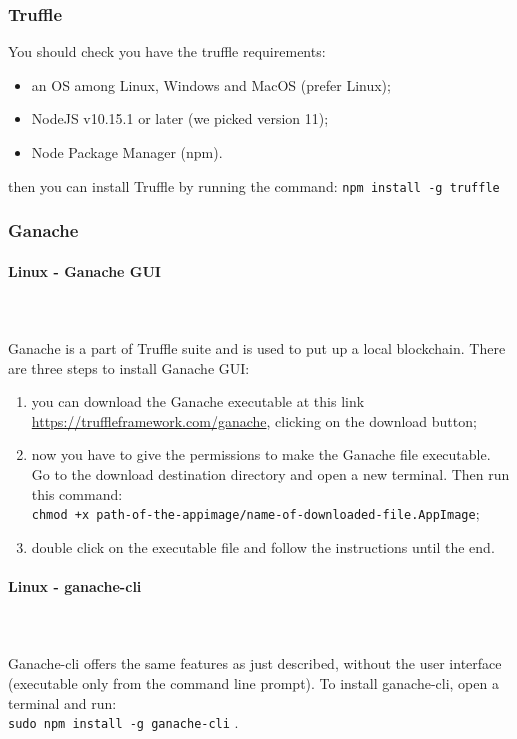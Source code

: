 \subsubsection{Truffle}
You should check you have the truffle requirements:
\begin{itemize}
	\item an OS among Linux, Windows and MacOS (prefer Linux);
	\item NodeJS v10.15.1 or later (we picked version 11);
	\item Node Package Manager (npm\glo).
\end{itemize}
then you can install Truffle by running the command: \texttt{npm install -g truffle}


\subsubsection{Ganache}
\paragraph{Linux - Ganache GUI} \mbox{} \\ \mbox{} \\
Ganache is a part of Truffle suite and is used to put up a local blockchain.
There are three steps to install Ganache GUI:
\begin{enumerate}
	\item you can download the Ganache executable at this link \url{https://truffleframework.com/ganache}, clicking on the download button;
	\item now you have to give the permissions to make the Ganache file executable. Go to the download destination directory and open a new terminal. Then run this command: \\\texttt{chmod +x path-of-the-appimage/name-of-downloaded-file.AppImage};
	\item double click on the executable file and follow the instructions until the end.
\end{enumerate}
\paragraph{Linux - ganache-cli} \mbox{} \\ \mbox{} \\
Ganache-cli offers the same features as just described, without the user interface (executable only from the command line prompt).
To install ganache-cli, open a terminal and run: \\ \texttt{sudo npm install -g ganache-cli} .
